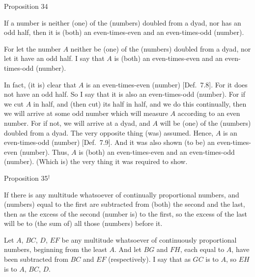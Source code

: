 
\begin{center}
{\large Proposition 34}
\end{center}

If a number is neither (one) of the (numbers) doubled from a dyad, nor
has an odd half, then it is (both) an even-times-even and an even-times-odd
(number).

\epsfysize=0.175in
\centerline{}

For let the number $A$   neither be (one) of the (numbers) doubled from a
dyad, nor let it have an odd half. I say that $A$ is (both) an even-times-even
and an even-times-odd (number).

In fact, (it is) clear that $A$ is an even-times-even (number) [Def.~7.8]. For it does
not have an odd half. So I say that it is also an even-times-odd (number). 
For if we cut $A$ in half, and (then cut) its half in half, and we do this continually, then we will arrive at some odd number which will measure
$A$ according to an even number. For if not, we will arrive at a dyad,
and $A$ will be (one) of the (numbers) doubled from a dyad. The very opposite thing (was) assumed. Hence, $A$ is an even-times-odd (number)
[Def.~7.9]. And it was also shown (to be) an
even-times-even (number). Thus, $A$ is (both) an even-times-even and
an even-times-odd (number). (Which is) the very thing it was required to
show.


\begin{center}
{\large Proposition 35}$^\dag$
\end{center}

If there is any multitude whatsoever of continually
proportional numbers, and (numbers) equal to the first are subtracted from (both) the
second and the last, then as the excess of the second (number is) to the first, so
the excess of the last will be to (the sum of) all   those (numbers) before it.

\epsfysize=1.6in
\centerline{}

Let $A$, $BC$, $D$, $EF$ be any multitude whatsoever of continuously proportional numbers, beginning from the least $A$.  And let $BG$ and
$FH$, each equal to $A$, have been subtracted from $BC$ and $EF$ (respectively). I say that as $GC$ is to $A$, so $EH$ is to $A$, $BC$, $D$.

